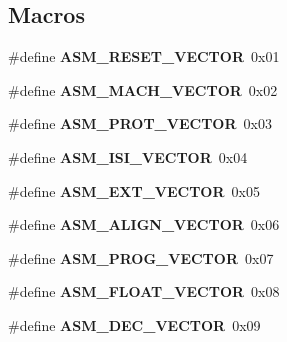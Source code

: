 \subsection*{Macros}
\begin{DoxyCompactItemize}
\item 
\mbox{\label{group__ppc__exc_ga61358d689d7a3c05272ac2a491d16655}} 
\#define {\bfseries A\+S\+M\+\_\+\+R\+E\+S\+E\+T\+\_\+\+V\+E\+C\+T\+OR}~0x01
\item 
\mbox{\label{group__ppc__exc_gade3d8c20b6e50839dce0bdd9d805ee89}} 
\#define {\bfseries A\+S\+M\+\_\+\+M\+A\+C\+H\+\_\+\+V\+E\+C\+T\+OR}~0x02
\item 
\mbox{\label{group__ppc__exc_ga62321511895604238a90595e6fb6f9c6}} 
\#define {\bfseries A\+S\+M\+\_\+\+P\+R\+O\+T\+\_\+\+V\+E\+C\+T\+OR}~0x03
\item 
\mbox{\label{group__ppc__exc_ga768df4808c058c1d65037a93eddca4e9}} 
\#define {\bfseries A\+S\+M\+\_\+\+I\+S\+I\+\_\+\+V\+E\+C\+T\+OR}~0x04
\item 
\mbox{\label{group__ppc__exc_gaf0b66c8c7781d942c277fd731aa1db1f}} 
\#define {\bfseries A\+S\+M\+\_\+\+E\+X\+T\+\_\+\+V\+E\+C\+T\+OR}~0x05
\item 
\mbox{\label{group__ppc__exc_ga0d89d6591fe941337f64e4f915dd3dae}} 
\#define {\bfseries A\+S\+M\+\_\+\+A\+L\+I\+G\+N\+\_\+\+V\+E\+C\+T\+OR}~0x06
\item 
\mbox{\label{group__ppc__exc_ga54b4836ebe5d0eb2f165cd32dfaf0b32}} 
\#define {\bfseries A\+S\+M\+\_\+\+P\+R\+O\+G\+\_\+\+V\+E\+C\+T\+OR}~0x07
\item 
\mbox{\label{group__ppc__exc_gad8f167e5d989e7df00007855ac802e1a}} 
\#define {\bfseries A\+S\+M\+\_\+\+F\+L\+O\+A\+T\+\_\+\+V\+E\+C\+T\+OR}~0x08
\item 
\mbox{\label{group__ppc__exc_gae820d499406856065a3581d1a4135c41}} 
\#define {\bfseries A\+S\+M\+\_\+\+D\+E\+C\+\_\+\+V\+E\+C\+T\+OR}~0x09
\item 
\mbox{\label{group__ppc__exc_gab25f32150e6b9fa3dace62858bf909f4}} 

\end{DoxyCompactItemize}
